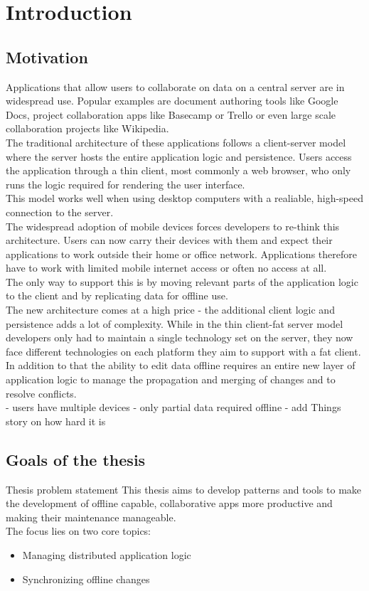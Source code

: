 
\chapter{Introduction}\label{intro}

\section{Motivation}
Applications that allow users to collaborate on data on a central server are in widespread use. Popular examples are document authoring tools like Google Docs, project collaboration apps like Basecamp or Trello or even large scale collaboration projects like Wikipedia.\\
The traditional architecture of these applications follows a client-server model where the server hosts the entire application logic and persistence. Users access the application through a thin client, most commonly a web browser, who only runs the logic required for rendering the user interface.\\
This model works well when using desktop computers with a realiable, high-speed connection to the server.\\
The widespread adoption of mobile devices forces developers to re-think this architecture. Users can now carry their devices with them and expect their applications to work outside their home or office network.
Applications therefore have to work with limited mobile internet access or often no access at all.\\
The only way to support this is by moving relevant parts of the application logic to the client and by replicating data for offline use.\\
The new architecture comes at a high price - the additional client logic and persistence adds a lot of complexity. While in the thin client-fat server model developers only had to maintain a single technology set on the server, they now face different technologies on each platform they aim to support with a fat client.\\
In addition to that the ability to edit data offline requires an entire new layer of application logic to manage the propagation and merging of changes and to resolve conflicts.\\

- users have multiple devices
- only partial data required offline
- add Things story on how hard it is

\section{Goals of the thesis}
Thesis problem statement
This thesis aims to develop patterns and tools to make the development of offline capable, collaborative apps more productive and making their maintenance manageable.\\
The focus lies on two core topics:
\begin{itemize}
\item Managing distributed application logic
\item Synchronizing offline changes
\end{itemize}


